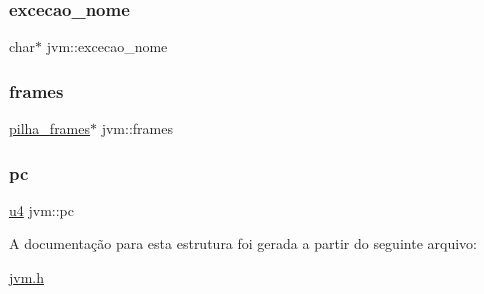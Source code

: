 \mbox{\label{structjvm_a471ac752db9424623227c661b194399b}} 
\subsubsection{\texorpdfstring{excecao\+\_\+nome}{excecao\_nome}}
{\footnotesize\ttfamily char$\ast$ jvm\+::excecao\+\_\+nome}

\mbox{\label{structjvm_a4277814c8cb94f0e77f09428d3d668b9}} 
\subsubsection{\texorpdfstring{frames}{frames}}
{\footnotesize\ttfamily \hyperlink{structpilha__frames}{pilha\+\_\+frames}$\ast$ jvm\+::frames}

\mbox{\label{structjvm_ac879eb42576afb2256646f478a7f68c2}} 
\subsubsection{\texorpdfstring{pc}{pc}}
{\footnotesize\ttfamily \hyperlink{lista__operandos_8h_ae5be1f726785414dd1b77d60df074c9d}{u4} jvm\+::pc}



A documentação para esta estrutura foi gerada a partir do seguinte arquivo\+:\begin{DoxyCompactItemize}
\item 
\hyperlink{jvm_8h}{jvm.\+h}\end{DoxyCompactItemize}
